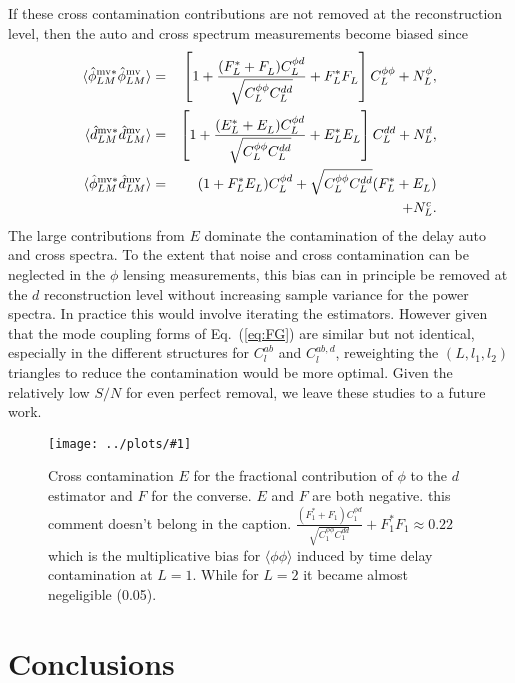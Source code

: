 \documentclass[prd,amsmath,amssymb,floatfix,superscriptaddress,nofootinbib,twocolumn]{revtex4-1}
\def\bea{\begin{eqnarray}}
\def\eea{\end{eqnarray}}
\newcommand{\ec}[1]{Eq.~(\ref{eq:#1})}
\newcommand{\sfig}[2]{
\texttt{[image: ../plots/\#1]}
        }
\newcommand{\Sfig}[2]{
   \begin{figure}[thbp]
   \begin{center}
    \sfig{#1.pdf}{\columnwidth}
    \caption{{\small #2}}
    \label{fig:#1}
     \end{center}
   \end{figure}
}
\newcommand{\peikai}[1]{{\color{blue} #1}}
\newcommand{\wh}[1]{{\color{red} #1}}
\begin{document}
 If these cross contamination contributions are not removed at the reconstruction level, then
 the auto and cross spectrum measurements become biased since
 \bea
  \langle \hat{\phi}^{\rm mv*}_{LM}\hat{\phi}^{\rm mv}_{LM} \rangle &=&
  \left[ 1 +\frac{(F_L^{*}+F_L^{} )C_L^{\phi d}}{\sqrt{C_L^{\phi\phi} C_L^{dd} }}
  + F_L^{*}F_L^{} \right] C_L^{\phi\phi} 
  + N_L^{\phi}, \nonumber\\
    \langle \hat{d}^{\rm mv*}_{LM}\hat{d}^{\rm mv}_{LM} \rangle &=&
  \left[ 1 +\frac{(E_L^{*}+E_L^{} )C_L^{\phi d}}{\sqrt{C_L^{\phi\phi} C_L^{dd} }}
  + E_L^{*}E_L^{} \right] C_L^{dd} 
  + N_L^{d}, \nonumber\\
 \langle \hat{\phi}^{\rm mv*}_{LM}\hat{d}^{\rm mv}_{LM} \rangle&=& (1+ F_L^{*} E_L^{}){C}_{L}^{\phi d}+ \sqrt{C_{L}^{\phi\phi} C_{L}^{dd}} ( F_L^{*} + E_L^{}) \nonumber\\
&&  +N_{L}^{c} .
\eea
The large contributions from $E$ dominate the contamination of the delay auto and cross spectra.   To the extent that noise and cross contamination can be neglected in the $\phi$ lensing measurements, this bias can in principle be removed at the $d$ reconstruction level without increasing sample variance for the power spectra.    In practice this would involve iterating
the estimators.   However given that the mode 
coupling forms  of \ec{FG} are similar but not identical, especially in the different structures for $C_l^{ab}$ and $C_l^{ab,d}$, reweighting the $(L,l_1,l_2)$ triangles
to reduce the contamination would be more optimal.  Given the relatively low $S/N$ for 
even perfect removal, we leave these studies to a future work.




\Sfig{Cont_multi}{\peikai{Cross contamination $E$ for the fractional contribution of $\phi$ to the $d$ estimator and $F$ for the converse. $E$ and $F$ are both negative. \wh{this comment doesn't belong in the caption. }$\frac{(F_1^{*}+F_1^{} )C_1^{\phi d}}{\sqrt{C_1^{\phi\phi} C_1^{dd} }}
  + F_1^{*}F_1^{}\approx0.22$ which is the multiplicative bias for $\langle \phi \phi \rangle$ induced by time delay contamination at $L=1$. While for $L=2$ it became almost negeligible (0.05).}}


\section{Conclusions}
\end{document}
